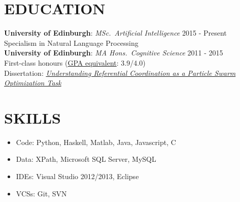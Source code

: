 \documentclass[line, margin]{res}
\newcommand{\CS}{C\nolinebreak\hspace{-.05em}\raisebox{.6ex}{\scriptsize\bf \#}}
\begin{document}
\address{204/1F2 Dalkeith Road, Edinburgh, Scotland EH16 5DT | +44 771 966 3016 | chase@chasestevens.com}

\begin{resume}
\section{EDUCATION}
\textbf{University of Edinburgh}: \textit{MSc.\ Artificial Intelligence} \hfill 2015 - Present\\
Specialism in Natural Language Processing \\[5pt]
\textbf{University of Edinburgh}: \textit{MA Hons.\ Cognitive Science} \hfill 2011 - 2015\\
First-class honours (\href{http://www.ed.ac.uk/schools-departments/student-administration/exams/regulations/credit-allocation}{GPA equivalent}: 3.9/4.0)\\
Dissertation: \textit{\href{http://www.chasestevens.com/papers/undergrad_dissertation.pdf}{Understanding Referential Coordination as a Particle Swarm Optimization Task}}

\section{SKILLS}
\begin{itemize}[leftmargin=10pt]
\item Code: Python, Haskell, Matlab, Java, Javascript, \CS
\item Data: XPath, Microsoft SQL Server, MySQL
\item IDEs: Visual Studio 2012/2013, Eclipse
\item VCSs: Git, SVN
\end{itemize}


\end{resume}
\end{document}
